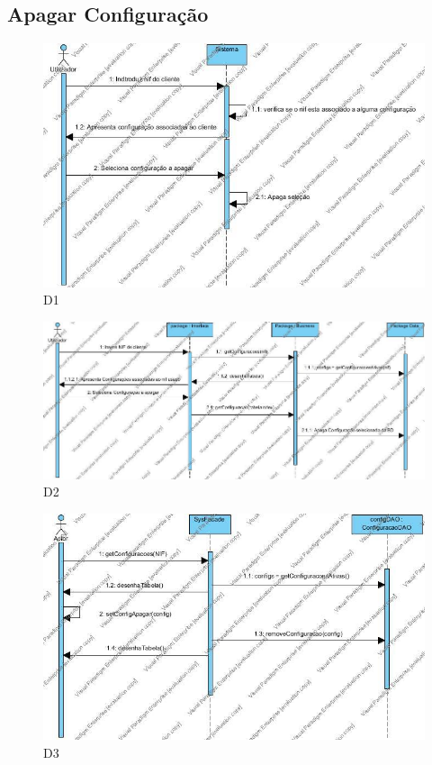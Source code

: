 \subsection{Apagar Configuração}

\begin{figure}[H]
    \centering
    \includegraphics[width=\textwidth]{diagramas_de_sequencia/imgs/UC7D1.jpg}
    \caption{D1}
\end{figure}
\begin{figure}[H]
    \centering
    \includegraphics[width=\textwidth]{diagramas_de_sequencia/imgs/UC7D2.jpg}
    \caption{D2}
\end{figure}
\begin{figure}[H]
    \centering
    \includegraphics[width=\textwidth]{diagramas_de_sequencia/imgs/UC7D3.jpg}
    \caption{D3}
\end{figure}
